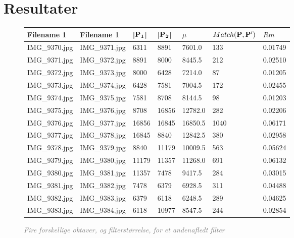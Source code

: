 \section{Resultater}

\begin{figure}[H]
    \centering
    \begin{center}    
    \begin{tabular}{ | l | l | l | l | l | l | l |}
    \hline
    Filename 1 & Filename 1 & |$\bold{P_1}$| & |$\bold{P_2}$| & $\mu$ & $Match(\bold{P}, \bold{P}')$ & $Rm$ \\ \hline
IMG\_9370.jpg &	IMG\_9371.jpg &	6311 &	8891 &	7601.0 &	133 &	0.01749\\ \hline
IMG\_9371.jpg &	IMG\_9372.jpg &	8891 &	8000 &	8445.5 &	212 &	0.02510\\ \hline
IMG\_9372.jpg &	IMG\_9373.jpg &	8000 &	6428 &	7214.0 &	87 &	0.01205\\ \hline
IMG\_9373.jpg &	IMG\_9374.jpg &	6428 &	7581 &	7004.5 &	172 &	0.02455\\ \hline
IMG\_9374.jpg &	IMG\_9375.jpg &	7581 &	8708 &	8144.5 &	98 &	0.01203\\ \hline
IMG\_9375.jpg &	IMG\_9376.jpg &	8708 &	16856 &	12782.0 &	282 &	0.02206\\ \hline
IMG\_9376.jpg &	IMG\_9377.jpg &	16856 &	16845 &	16850.5 &	1040 &	0.06171\\ \hline
IMG\_9377.jpg &	IMG\_9378.jpg &	16845 &	8840 &	12842.5 &	380 &	0.02958\\ \hline
IMG\_9378.jpg &	IMG\_9379.jpg &	8840 &	11179 &	10009.5 &	563 &	0.05624\\ \hline
IMG\_9379.jpg &	IMG\_9380.jpg &	11179 &	11357 &	11268.0 &	691 &	0.06132\\ \hline
IMG\_9380.jpg &	IMG\_9381.jpg &	11357 &	7478 &	9417.5 &	284 &	0.03015\\ \hline
IMG\_9381.jpg &	IMG\_9382.jpg &	7478 &	6379 &	6928.5 &	311 &	0.04488\\ \hline
IMG\_9382.jpg &	IMG\_9383.jpg &	6379 &	6118 &	6248.5 &	289 &	0.04625\\ \hline
IMG\_9383.jpg &	IMG\_9384.jpg &	6118 &	10977 &	8547.5 &	244 &	0.02854\\ \hline

    \end{tabular}       
    \caption{\textcolor{gray}{\footnotesize \textit{Fire forskellige oktaver, og filterstørrelse, for et andenafledt filter}}}
    \label{fig:secderivfiltersize}
     \end{center}
     \vspace{-2.5em}
\end{figure} \noindent
